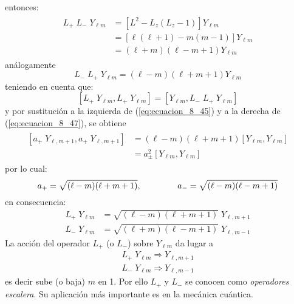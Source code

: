 entonces:
\begin{eqnarray}
\begin{aligned}
L_{+} \; L_{-} \; Y_{\ell m} &= [ L^{2} - L_{z} (L_{z} - 1)] Y_{\ell m} \\
&= [\ell (\ell + 1) - m (m -1)] Y_{\ell m} \\
&= (\ell + m)(\ell - m + 1) Y_{\ell m}
\end{aligned}
\label{eq:ecuacion_8_46}
\end{eqnarray}
análogamente
\begin{equation}
L_{-} \; L_{+} \; Y_{\ell m} = (\ell - m)(\ell + m + 1) Y_{\ell m}
\label{eq:ecuacion_8_47}
\end{equation}
teniendo en cuenta que:
\[ [L_{+} \; Y_{\ell m}, L_{+} \; Y_{\ell m}] = [Y_{\ell m}, L_{-} \; L_{+} \; Y_{\ell m}] \]
y por sustitución a la izquierda de (\ref{eq:ecuacion_8_45}) y a la derecha de (\ref{eq:ecuacion_8_47}), se obtiene
\begin{eqnarray}
\begin{aligned}
 \left[ a_{+} \; Y_{\ell, m+1}, a_{+} \; Y_{\ell, m+1} \right] &= (\ell - m) (\ell + m + 1) [Y_{\ell m}, Y_{\ell m}] \\
&= a^{2}_{\pm} [Y_{\ell m}, Y_{\ell m}] 
\end{aligned}
\label{eq:ecuacion_8_48}
\end{eqnarray}
por lo cual:
\[ a_{+} = \sqrt{(\ell - m)(\ell + m + 1)}, \hspace{1.5cm} a_{-} = \sqrt{(\ell - m)(\ell - m + 1)} \]
en consecuencia:
\begin{eqnarray*}
L_{+} \; Y_{\ell m} &= \sqrt{(\ell - m)(\ell + m + 1)} \; Y_{\ell, m+1} \nonumber \\
L_{-} \; Y_{\ell m} &= \sqrt{(\ell + m)(\ell - m + 1)} \; Y_{\ell, m-1} \nonumber
\end{eqnarray*}
La acción del operador $L_{+}$ (o $L_{-}$) sobre $Y_{\ell m}$ da lugar a
\begin{eqnarray*}
L_{+} \; Y_{\ell m} \Rightarrow Y_{\ell, m+1} \nonumber \\
L_{-} \; Y_{\ell m} \Rightarrow Y_{\ell, m-1} \nonumber
\end{eqnarray*} 
es decir sube (o baja) $m$ en 1. Por ello $L_{+}$ y $L_{-}$ se conocen como \emph{operadores escalera}. Su aplicación más importante es en la mecánica cuántica.







